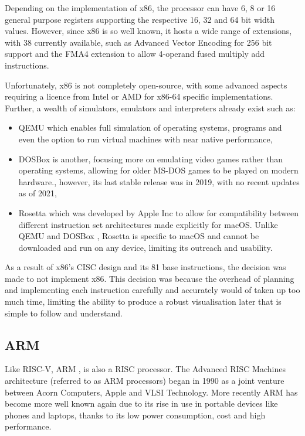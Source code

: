 Depending on the implementation of x86, the processor can have 6, 8 or 16 general purpose registers supporting the respective 16, 32 and 64 bit width values. However, since x86 \cite{intelcorporation_2023_intel} is so well known, it hosts a wide range of extensions, with 38 currently available, such as Advanced Vector Encoding for 256 bit support and the FMA4 extension to allow 4-operand fused multiply add instructions.

Unfortunately, x86 is not completely open-source, with some advanced aspects requiring a licence from Intel or AMD for x86-64 specific implementations. Further, a wealth of simulators, emulators and interpreters already exist such as:
\begin{itemize}
    \item QEMU \cite{bellard_2023_qemu} which enables full simulation of operating systems, programs and even the option to run virtual machines with near native performance,
    \item DOSBox \cite{dosbox_2021_dosbox} is another, focusing more on emulating video games rather than operating systems, allowing for older MS-DOS games to be played on modern hardware., however, its last stable release was in 2019, with no recent updates as of 2021,
    \item Rosetta \cite{appleinc_2023_about} which was developed by Apple Inc to allow for compatibility between different instruction set architectures made explicitly for macOS. Unlike QEMU \cite{bellard_2023_qemu} and DOSBox \cite{dosbox_2021_dosbox}, Rosetta is specific to macOS and cannot be downloaded and run on any device, limiting its outreach and usability.
\end{itemize}



As a result of x86's CISC design and its 81 base instructions, the decision was made to not implement x86. This decision was because the overhead of planning and implementing each instruction carefully and accurately would of taken up too much time, limiting the ability to produce a robust visualisation later that is simple to follow and understand.
\subsection{ARM}
Like RISC-V, ARM \cite{armltd_2023_defining}, is also a \ac{RISC} processor. The Advanced RISC Machines architecture (referred to as ARM processors) began in 1990 as a joint venture between Acorn Computers, Apple and VLSI Technology. More recently ARM has become more well known again due to its rise in use in portable devices like phones and laptops, thanks to its low power consumption, cost and high performance. \cite{schmitt_2021_is}

